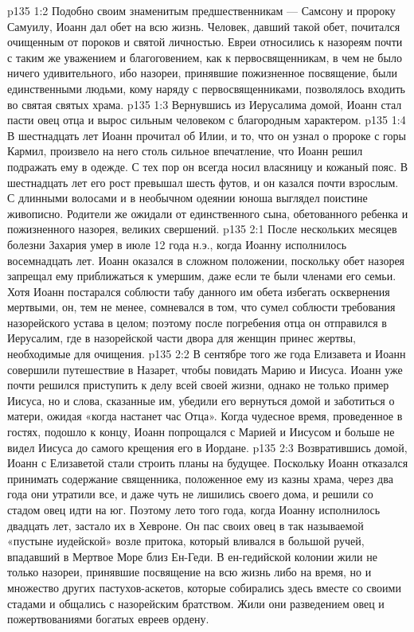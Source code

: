 \vs p135 1:2 Подобно своим знаменитым предшественникам --- Самсону и пророку Самуилу, Иоанн дал обет на всю жизнь. Человек, давший такой обет, почитался очищенным от пороков и святой личностью. Евреи относились к назореям почти с таким же уважением и благоговением, как к первосвященникам, в чем не было ничего удивительного, ибо назореи, принявшие пожизненное посвящение, были единственными людьми, кому наряду с первосвященниками, позволялось входить во святая святых храма.
\vs p135 1:3 \pc Вернувшись из Иерусалима домой, Иоанн стал пасти овец отца и вырос сильным человеком с благородным характером.
\vs p135 1:4 В шестнадцать лет Иоанн прочитал об Илии, и то, что он узнал о пророке с горы Кармил, произвело на него столь сильное впечатление, что Иоанн решил подражать ему в одежде. С тех пор он всегда носил власяницу и кожаный пояс. В шестнадцать лет его рост превышал шесть футов, и он казался почти взрослым. С длинными волосами и в необычном одеянии юноша выглядел поистине живописно. Родители же ожидали от единственного сына, обетованного ребенка и пожизненного назорея, великих свершений.
\vs p135 2:1 После нескольких месяцев болезни Захария умер в июле 12 года н.э., когда Иоанну исполнилось восемнадцать лет. Иоанн оказался в сложном положении, поскольку обет назорея запрещал ему приближаться к умершим, даже если те были членами его семьи. Хотя Иоанн постарался соблюсти табу данного им обета избегать осквернения мертвыми, он, тем не менее, сомневался в том, что сумел соблюсти требования назорейского устава в целом; поэтому после погребения отца он отправился в Иерусалим, где в назорейской части двора для женщин принес жертвы, необходимые для очищения.
\vs p135 2:2 \pc В сентябре того же года Елизавета и Иоанн совершили путешествие в Назарет, чтобы повидать Марию и Иисуса. Иоанн уже почти решился приступить к делу всей своей жизни, однако не только пример Иисуса, но и слова, сказанные им, убедили его вернуться домой и заботиться о матери, ожидая «когда настанет час Отца». Когда чудесное время, проведенное в гостях, подошло к концу, Иоанн попрощался с Марией и Иисусом и больше не видел Иисуса до самого крещения его в Иордане.
\vs p135 2:3 Возвратившись домой, Иоанн с Елизаветой стали строить планы на будущее. Поскольку Иоанн отказался принимать содержание священника, положенное ему из казны храма, через два года они утратили все, и даже чуть не лишились своего дома, и решили со стадом овец идти на юг. Поэтому лето того года, когда Иоанну исполнилось двадцать лет, застало их в Хевроне. Он пас своих овец в так называемой «пустыне иудейской» возле притока, который вливался в большой ручей, впадавший в Мертвое Море близ Ен\hyp{}Геди. В ен\hyp{}гедийской колонии жили не только назореи, принявшие посвящение на всю жизнь либо на время, но и множество других пастухов\hyp{}аскетов, которые собирались здесь вместе со своими стадами и общались с назорейским братством. Жили они разведением овец и пожертвованиями богатых евреев ордену.
